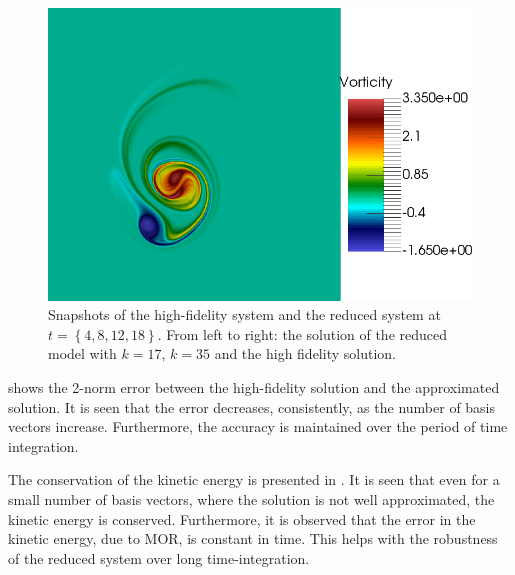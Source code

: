 \begin{figure}[t]
\includegraphics[scale=0.06]{data/Incompressible_Euler/Snapshots/Full_5.png}

\caption{Snapshots of the high-fidelity system and the reduced system at $t=\left\{ 4,8,12,18 \right\}$. From left to right: the solution of the reduced model with $k=17$, $k=35$ and the high fidelity solution.}
\label{fig:snap_solution_incompressible_Euler}
\end{figure}


 shows the 2-norm error between the high-fidelity solution and the approximated solution. It is seen that the error decreases, consistently, as the number of basis vectors increase. Furthermore, the accuracy is maintained over the period of time integration.

The conservation of the kinetic energy is presented in . It is seen that even for a small number of basis vectors, where the solution is not well approximated, the kinetic energy is conserved. Furthermore, it is observed that the error in the kinetic energy, due to MOR, is constant in time. This helps with the robustness of the reduced system over long time-integration.


